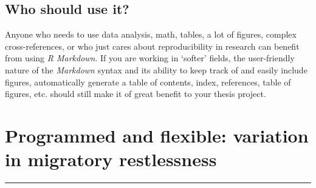 \documentclass[a4paper, twoside]{templates/ociamthesis}
\begin{document}
\hypertarget{who-should-use-it}{%
\section*{Who should use it?}\label{who-should-use-it}}

Anyone who needs to use data analysis, math, tables, a lot of figures, complex cross-references, or who just cares about reproducibility in research can benefit from using \emph{R Markdown}.
If you are working in `softer' fields, the user-friendly nature of the \emph{Markdown} syntax and its ability to keep track of and easily include figures, automatically generate a table of contents, index, references, table of figures, etc. should still make it of great benefit to your thesis project.

\hypertarget{programmed-and-flexible}{%
\chapter{Programmed and flexible: variation in migratory restlessness}\label{programmed-and-flexible}}

\minitoc 

\begin{center}\rule{0.5\linewidth}{\linethickness}\end{center}
\end{document}
